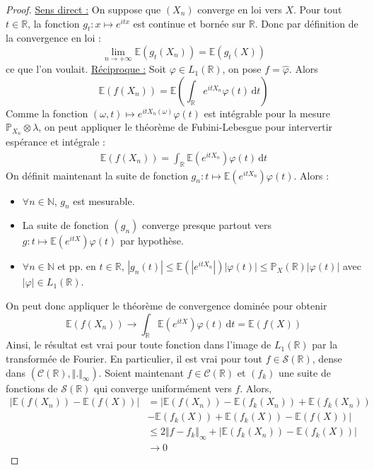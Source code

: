   \begin{proof}
    \uline{Sens direct :} On suppose que $(X_n)$ converge en loi vers $X$. Pour tout $t \in \mathbb{R}$, la fonction $g_t : x \mapsto e^{itx}$ est continue et bornée sur $\mathbb{R}$. Donc par définition de la convergence en loi :
    \[ \lim_{n \rightarrow +\infty} \mathbb{E}(g_t(X_n)) = \mathbb{E}(g_t(X)) \]
    ce que l'on voulait.
    \newpar
    \uline{Réciproque :} Soit $\varphi \in L_1(\mathbb{R})$, on pose $f = \widehat{\varphi}$. Alors
    \[ \mathbb{E}(f(X_n)) = \mathbb{E} \left ( \int_{\mathbb{R}} e^{itX_n} \varphi(t) \, \mathrm{d}t \right ) \]
    Comme la fonction $(\omega, t) \mapsto e^{itX_n(\omega)} \varphi(t)$ est intégrable pour la mesure $\mathbb{P}_{X_n} \otimes \lambda$, on peut appliquer le théorème de Fubini-Lebesgue pour intervertir espérance et intégrale :
    \begin{align*}
      \mathbb{E}(f(X_n)) = \int_{\mathbb{R}} \mathbb{E} (e^{itX_n}) \varphi(t) \, \mathrm{d}t
    \end{align*}
    On définit maintenant la suite de fonction $g_n : t \mapsto \mathbb{E} (e^{itX_n}) \varphi(t)$. Alors :
    \begin{itemize}
      \item $\forall n \in \mathbb{N}$, $g_n$ est mesurable.
      \item La suite de fonction $(g_n)$ converge presque partout vers $g : t \mapsto \mathbb{E} (e^{itX}) \varphi(t)$ par hypothèse.
      \item $\forall n \in \mathbb{N}$ et pp. en $t \in \mathbb{R}$, $|g_n(t)| \leq \mathbb{E} (|e^{itX_n}|) |\varphi(t)| \leq \mathbb{P}_X(\mathbb{R}) |\varphi(t)|$ avec $|\varphi| \in L_1(\mathbb{R})$.
    \end{itemize}
    On peut donc appliquer le théorème de convergence dominée pour obtenir
    \[ \mathbb{E}(f(X_n)) \longrightarrow \int_{\mathbb{R}} \mathbb{E} (e^{itX}) \varphi(t) \, \mathrm{d}t = \mathbb{E}(f(X)) \]
    Ainsi, le résultat est vrai pour toute fonction dans l'image de $L_1(\mathbb{R})$ par la transformée de Fourier. En particulier, il est vrai pour tout $f \in \mathcal{S}(\mathbb{R})$, dense dans $(\mathcal{C}(\mathbb{R}), \Vert . \Vert_\infty)$. Soient maintenant $f \in \mathcal{C}(\mathbb{R})$ et $(f_k)$ une suite de fonctions de $\mathcal{S}(\mathbb{R})$ qui converge uniformément vers $f$. Alors,
    \begin{align*}
      |\mathbb{E}(f(X_n)) - \mathbb{E}(f(X))| &= |\mathbb{E}(f(X_n)) - \mathbb{E}(f_k(X_n)) + \mathbb{E}(f_k(X_n)) \\
      &- \mathbb{E}(f_k(X)) + \mathbb{E}(f_k(X)) - \mathbb{E}(f(X))| \\
      &\leq 2 \Vert f - f_k \Vert_\infty + |\mathbb{E}(f_k(X_n)) - \mathbb{E}(f_k(X))| \\
      &\longrightarrow 0
    \end{align*}
  \end{proof}


